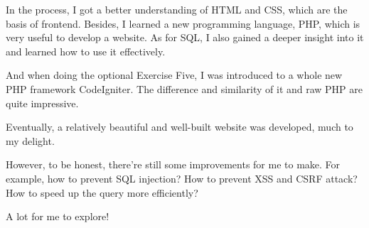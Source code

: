 \documentclass[a4paper]{article}
\begin{document}
In the process, I got a better understanding of HTML and CSS, which are the basis of frontend. Besides, I learned a new programming language, PHP, which is very useful to develop a website. As for SQL, I also gained a deeper insight into it and learned how to use it effectively.

And when doing the optional Exercise Five, I was introduced to a whole new PHP framework CodeIgniter. The difference and similarity of it and raw PHP are quite impressive.

Eventually, a relatively beautiful and well-built website was developed, much to my delight.

However, to be honest, there're still some improvements for me to make. For example, how to prevent SQL injection? How to prevent XSS and CSRF attack? How to speed up the query more efficiently?

A lot for me to explore!
\end{document}
